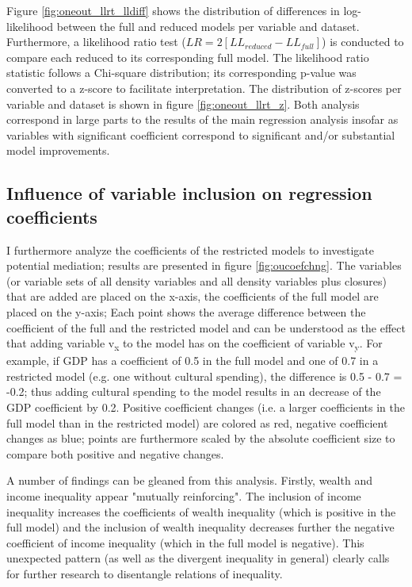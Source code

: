 \documentclass[11pt, authoryear]{elsarticle}
\begin{document}
Figure \ref{fig:oneout_llrt_lldiff} shows the distribution of differences in log-likelihood between the full and reduced models per variable and dataset.
Furthermore, a likelihood ratio test (\(LR = 2[LL_{reduced} - LL_{full}]\)) is conducted to compare each reduced to its corresponding full model.
The likelihood ratio statistic follows a Chi-square distribution; its corresponding p-value was converted to a z-score to facilitate interpretation.
The distribution of z-scores per variable and dataset is shown in figure \ref{fig:oneout_llrt_z}.
Both analysis correspond in large parts to the results of the main regression analysis insofar as variables with significant coefficient correspond to significant and/or substantial model improvements.
\FloatBarrier



\subsection{Influence of variable inclusion on regression coefficients}
\label{app_mediation}
I furthermore analyze the coefficients of the restricted models to investigate potential mediation; results are presented in figure \ref{fig:oucoefchng}.
The variables (or variable sets of all density variables and all density variables plus closures) that are added are placed on the x-axis, the coefficients of the full model are placed on the y-axis;
Each point shows the average difference between the coefficient of the full and the restricted model and can be understood as the effect that adding variable v\textsubscript{x} to the model has on the coefficient of variable v\textsubscript{y}.
For example, if GDP has a coefficient of 0.5 in the full model and one of 0.7 in a restricted model (e.g. one without cultural spending), the difference is 0.5 - 0.7 = -0.2; thus adding cultural spending to the model results in an decrease of the GDP coefficient by 0.2. 
Positive coefficient changes (i.e. a larger coefficients in the full model than in the restricted model) are colored as red, negative coefficient changes as blue; points are furthermore scaled by the absolute coefficient size to compare both positive and negative changes. 


A number of findings can be gleaned from this analysis.
Firstly, wealth and income inequality appear "mutually reinforcing".
The inclusion of income inequality increases the coefficients of wealth inequality (which is positive in the full model) and the inclusion of wealth inequality decreases further the negative coefficient of income inequality (which in the full model is negative).
This unexpected pattern (as well as the divergent inequality in general) clearly calls for further research to disentangle relations of inequality.
\end{document}
